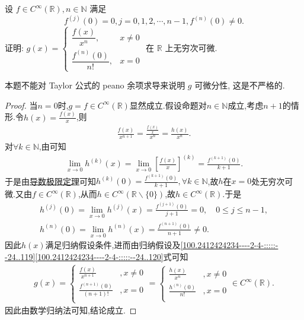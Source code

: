 \documentclass[../../main.tex]{subfiles}
\begin{document}
\begin{example}
设 $f \in C^\infty(\mathbb{R}), n \in \mathbb{N}$ 满足
\[
f^{(j)}(0) = 0, j = 0, 1, 2, \cdots, n - 1, f^{(n)}(0) \neq 0.
\]
证明: \( g(x) = \begin{cases} 
\dfrac{f(x)}{x^n}, & x \neq 0 \\
\dfrac{f^{(n)}(0)}{n!}, & x = 0 
\end{cases} \) 在 $\mathbb{R}$ 上无穷次可微.
\end{example}
\begin{note}
本题不能对 Taylor 公式的 peano 余项求导来说明 $g$ 可微分性, 这是不严格的.
\end{note}
\begin{proof}
当$n=0$时,$g=f\in C^{\infty}(\mathbb{R})$显然成立.假设命题对$n\in \mathbb{N}$成立,考虑$n+1$的情形.令$h(x)=\frac{f(x)}{x}$,则
\begin{align}
\frac{f(x)}{x^{n+1}}=\frac{\frac{f(x)}{x}}{x^n}=\frac{h(x)}{x^n}. \tag{100.2412424234----2-4-:::::--24..119}
\end{align}
对$\forall k\in \mathbb{N}$,由可知
\begin{align*}
\lim_{x\rightarrow 0}h^{(k)}(x)=\lim_{x\rightarrow 0}\left[ \frac{f(x)}{x} \right]^{(k)}=\frac{f^{(k+1)}(0)}{k+1}.
\end{align*}
于是由\hyperref[theorem:单侧导数极限定理]{导数极限定理}可知$h^{(k)}(0)=\frac{f^{(k+1)}(0)}{k+1},\forall k\in \mathbb{N}$,故$h$在$x=0$处无穷次可微.又由$f\in C^{\infty}(\mathbb{R})$,从而$h\in C^{\infty}(\mathbb{R}\backslash \{0\})$,故$h\in C^{\infty}(\mathbb{R})$.于是
\begin{gather}
h^{(j)}(0)=\lim_{x\rightarrow 0}h^{(j)}(x)=\frac{f^{(j+1)}(0)}{j+1}=0,\quad 0\leqslant j\leqslant n-1,\nonumber \\
h^{(n)}(0)=\lim_{x\rightarrow 0}h^{(n)}(x)=\frac{f^{(n+1)}(0)}{n+1}\ne 0. \label{100.2412424234----2-4-:::::--24..120}
\end{gather}
因此$h(x)$满足归纳假设条件,进而由归纳假设及\eqref{100.2412424234----2-4-:::::--24..119}\eqref{100.2412424234----2-4-:::::--24..120}式可知
\begin{align*}
g(x)=\begin{cases}
\frac{f(x)}{x^{n+1}}&,x\ne 0\\
\frac{f^{(n+1)}(0)}{(n+1)!}&,x=0\\
\end{cases}=\begin{cases}
\frac{h(x)}{x^n}&,x\ne 0\\
\frac{h^{(n)}(0)}{n!}&,x=0\\
\end{cases}\in C^{\infty}(\mathbb{R}).
\end{align*}
因此由数学归纳法可知,结论成立.
\end{proof}
\end{document}
